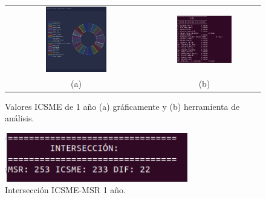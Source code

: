 \documentclass[a4paper, 12pt]{book}
\begin{document}
\begin{figure}[!h]
    \centering
    \begin{tabular}{cc}
    \includegraphics[width=0.45\textwidth]{img/icsme_1_year_graph.png} &  
    \includegraphics[width=0.52\textwidth]{img/icsme_1_year.png} \\ 
    (a) &(b) 
    \end{tabular}
    \caption{Valores ICSME de 1 año (a) gráficamente y (b) herramienta de análisis.}
    \label{fig:comp_icsme_1_year}
\end{figure}

\begin{figure}[h]
  \centering
  \includegraphics[width=8cm, keepaspectratio]{img/inter_1_year.png}
  \caption{Intersección ICSME-MSR 1 año.}
  \label{fig:inter_1_year}
\end{figure}
\end{document}

